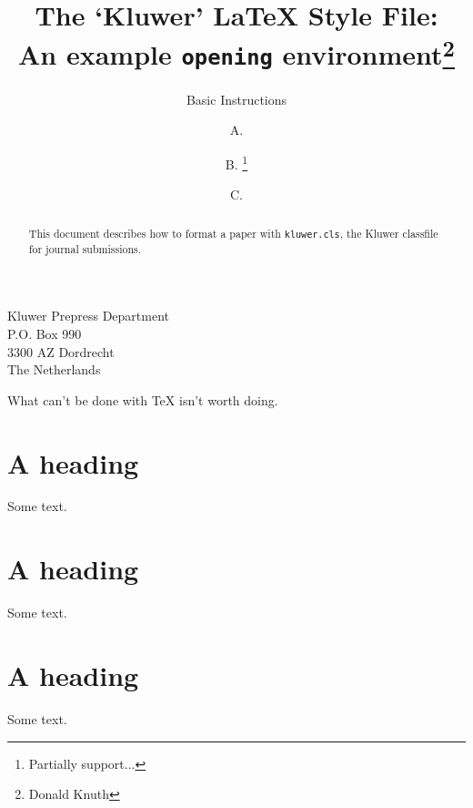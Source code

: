 \documentclass{kluwer}
\begin{document}
\begin{article}
\begin{opening}
\title{The `Kluwer' LaTeX Style File:\\
       An example \texttt{opening} environment\thanks{Donald Knuth}}            
\subtitle{Basic Instructions}

\author{A. }
\author{B. \thanks{Partially support...}} 
\author{C. }
\institute{}


\dedication{To Jim}



\begin{ao}
Kluwer Prepress Department\\
P.O. Box 990\\
3300 AZ Dordrecht\\
The Netherlands
\end{ao} 

\begin{motto}
What can't be done with TeX isn't worth doing.
\end{motto}

\begin{abstract} 
This document describes how to format a paper with
\texttt{kluwer.cls}, the Kluwer
classfile for journal submissions.
\end{abstract}




\end{opening}
\section{A heading}
Some text.
\newpage
\section{A heading}
Some text.
\newpage
\section{A heading}
Some text.
\newpage
\end{article}
\end{document}
